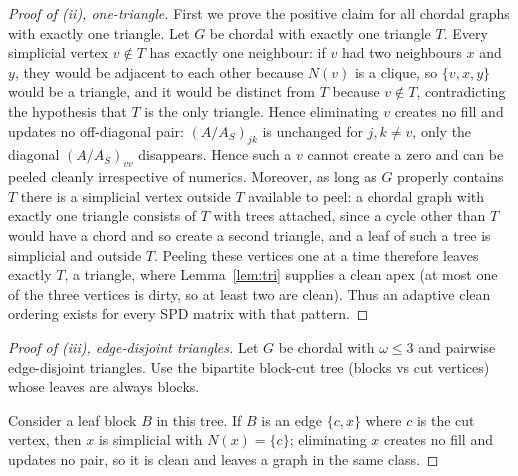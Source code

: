 \documentclass[11pt]{article}
\theoremstyle{plain}
\theoremstyle{definition}
\begin{document}
\begin{aiblock}
\begin{proof}[Proof of (ii), one-triangle]
First we prove the positive claim for all chordal graphs with exactly one triangle. Let $G$ be chordal with exactly one triangle $T$. Every simplicial vertex $v\notin T$ has exactly one neighbour: if $v$ had two neighbours $x$ and
$y$, they would be adjacent to each other because $N(v)$ is a clique, so $\{v,x,y\}$ would be a
triangle, and it would be distinct from $T$ because $v\notin T$, contradicting the hypothesis that
$T$ is the only triangle. Hence eliminating $v$ creates no fill and updates no off-diagonal pair: $(A/A_S)_{jk}$ is unchanged for $j,k\neq v$, only the diagonal $(A/A_S)_{vv}$ disappears. Hence such a $v$ cannot create a zero and can be peeled cleanly irrespective of numerics. Moreover, as long as $G$ properly contains $T$ there is a simplicial vertex outside $T$ available
to peel: a chordal graph with exactly one triangle consists of $T$ with trees attached, since a cycle
other than $T$ would have a chord and so create a second triangle, and a leaf of such a tree is
simplicial and outside $T$. Peeling these vertices one at a time therefore leaves exactly $T$, a
triangle, where Lemma~\ref{lem:tri} supplies a clean apex (at most one of the three vertices is dirty, so at least two are clean). Thus an adaptive clean ordering exists for every SPD matrix with that pattern.

\end{proof}

\begin{proof}[Proof of (iii), edge-disjoint triangles]
Let $G$ be chordal with $\omega\le3$ and pairwise edge-disjoint triangles. Use the bipartite block-cut tree (blocks vs cut vertices) whose leaves are always blocks.

Consider a leaf block $B$ in this tree. If $B$ is an edge $\{c,x\}$ where $c$ is the cut vertex, then $x$ is simplicial with $N(x)=\{c\}$; eliminating $x$ creates no fill and updates no pair, so it is clean and leaves a graph in the same class.


\end{proof}
\end{aiblock}
\end{document}
